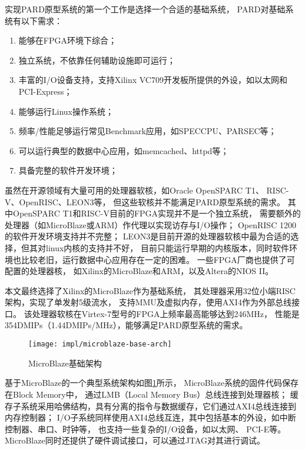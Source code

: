 实现PARD原型系统的第一个工作是选择一个合适的基础系统，
PARD对基础系统有以下需求：

\begin{enumerate}[leftmargin=2\parindent, nolistsep, label=\arabic*）]
  \item 能够在FPGA环境下综合；
  \item 独立系统，不依靠任何辅助设施即可运行；
  \item 丰富的I/O设备支持，支持Xilinx VC709开发板所提供的外设，如以太网和PCI-Express；
  \item 能够运行Linux操作系统；
  \item 频率/性能足够运行常见Benchmark应用，如SPECCPU、PARSEC等；
  \item 可以运行典型的数据中心应用，如memcached、httpd等；
  \item 具备完整的软件开发环境；
\end{enumerate}

虽然在开源领域有大量可用的处理器软核，如Oracle OpenSPARC T1\cite{sparct1}、
RISC-V\cite{riscv}、OpenRISC\cite{or1k}、LEON3\cite{leon3}等，
但这些软核并不能满足PARD原型系统的需求。
其中OpenSPARC T1和RISC-V目前的FPGA实现并不是一个独立系统，
需要额外的处理器（如MicroBlaze或ARM）作代理以实现访存与I/O操作；
OpenRISC 1200的软件开发环境支持并不完整；
LEON3是目前开源的处理器软核中最为合适的选择，但其对linux内核的支持并不好，
目前只能运行早期的内核版本，同时软件环境也比较老旧，运行数据中心应用存在一定的困难。
一些FPGA厂商也提供了可配置的处理器核，
如Xilinx的MicroBlaze\cite{microblaze}和ARM\cite{zynq}，以及Altera的NIOS II\cite{niosii}。

本文最终选择了Xilinx的MicroBlaze作为基础系统，
其处理器采用32位小端RISC架构，实现了单发射5级流水，
支持MMU及虚拟内存，使用AXI4作为外部总线接口\cite{microblaze-ref}。
该处理器软核在Virtex-7型号的FPGA上频率最高能够达到246MHz，
性能是354DMIPs（1.44DMIPs/MHz）\cite{microblaze}，能够满足PARD原型系统的需求。

\begin{figure}[tb]
  \centering
  \texttt{[image: impl/microblaze-base-arch]}
  \caption{MicroBlaze基础架构}
  \label{fig:microblaze-base-arch}
\end{figure}


基于MicroBlaze的一个典型系统架构如图\ref{fig:microblaze-base-arch}所示，
MicroBlaze系统的固件代码保存在Block Memory中，
通过LMB（Local Memory Bus）总线连接到处理器核；
缓存子系统采用哈佛结构，具有分离的指令与数据缓存，它们通过AXI4总线连接到内存控制器；
I/O子系统同样使用AXI4总线互连，其中包括基本的外设，如中断控制器、串口、时钟等，
也支持一些复杂的I/O设备，如以太网\cite{axi-ethernet-subsystem}、
PCI-E\cite{axi-pcie-bridge}等。
MicroBlaze同时还提供了硬件调试接口，可以通过JTAG对其进行调试。

